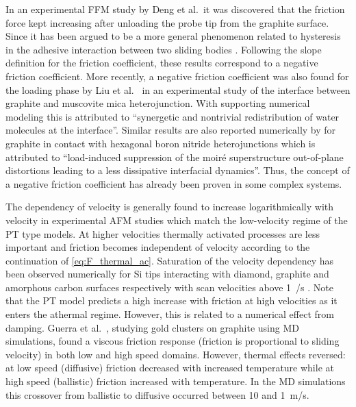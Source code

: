 In an experimental \acrshort{FFM} study by Deng et al.\ it was discovered that
the friction force kept increasing after unloading the probe tip from the
graphite surface. Since it has been argued to be a more general phenomenon
related to hysteresis in the adhesive interaction between two sliding bodies
\cite{thormann_negative_2013}. Following the slope definition for the friction
coefficient, these results correspond to a negative friction coefficient. More recently, a negative friction coefficient was also found for the loading phase by Liu et al.\ \cite{Liu_2020} in an experimental study of the interface between graphite and muscovite mica heterojunction. With supporting numerical modeling this is attributed to ``synergetic and nontrivial redistribution of water molecules at the interface''. Similar results are also reported numerically by \cite{Mandelli_2019} for graphite in contact with hexagonal boron nitride heterojunctions which is attributed to ``load-induced suppression of the moiré superstructure out-of-plane distortions leading to a less dissipative interfacial dynamics''. Thus, the concept of a negative friction coefficient has already been proven in some complex systems. 

The dependency of velocity is generally found to increase logarithmically with
velocity in experimental \acrshort{AFM} studies \cite[p. 201]{gnecco_meyer_2015}
which match the low-velocity regime of the \acrshort{PT} type models. At higher
velocities thermally activated processes are less important and friction becomes
independent of velocity according to the continuation of \cref{eq:F_thermal_ac}.
Saturation of the velocity dependency has been observed numerically for Si tips
interacting with diamond, graphite and amorphous carbon surfaces respectively
with scan velocities above \SI{1}{\mu/s} \cite{zworner1998velocity}. Note that
the \acrshort{PT} model predicts a high increase with friction at high
velocities as it enters the athermal regime. However, this is related to a
numerical effect from damping. Guerra et al.\ \cite{Guerra_2010}, studying gold
clusters on graphite using \acrshort{MD} simulations, found a viscous friction
response (friction is proportional to sliding velocity) in both low and high
speed domains. However, thermal effects reversed: at low speed (diffusive)
friction decreased with increased temperature while at high speed (ballistic)
friction increased with temperature. In the \acrshort{MD} simulations this
crossover from ballistic to diffusive occurred between 10 and \SI{1}{m/s}. 

